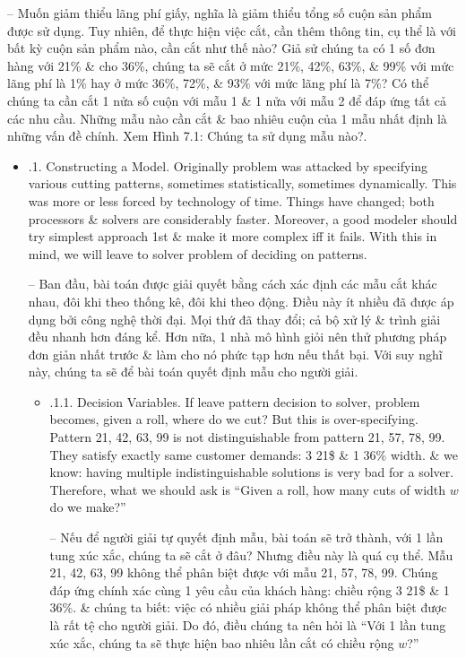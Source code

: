 \documentclass{article}
\begin{document}
\begin{itemize}
\begin{itemize}
        -- Muốn giảm thiểu lãng phí giấy, nghĩa là giảm thiểu tổng số cuộn sản phẩm được sử dụng. Tuy nhiên, để thực hiện việc cắt, cần thêm thông tin, cụ thể là với bất kỳ cuộn sản phẩm nào, cần cắt như thế nào? Giả sử chúng ta có 1 số đơn hàng với 21\% \& cho 36\%, chúng ta sẽ cắt ở mức 21\%, 42\%, 63\%, \& 99\% với mức lãng phí là 1\% hay ở mức 36\%, 72\%, \& 93\% với mức lãng phí là 7\%? Có thể chúng ta cần cắt 1 nửa số cuộn với mẫu 1 \& 1 nửa với mẫu 2 để đáp ứng tất cả các nhu cầu. Những mẫu nào cần cắt \& bao nhiêu cuộn của 1 mẫu nhất định là những vấn đề chính. Xem {\sf Hình 7.1: Chúng ta sử dụng mẫu nào?}.
        \begin{itemize}
            \item {.1. Constructing a Model.} Originally problem was attacked by specifying various cutting patterns, sometimes statistically, sometimes dynamically. This was more or less forced by technology of time. Things have changed; both processors \& solvers are considerably faster. Moreover, a good modeler should try simplest approach 1st \& make it more complex iff it fails. With this in mind, we will leave to solver problem of deciding on patterns.

            -- Ban đầu, bài toán được giải quyết bằng cách xác định các mẫu cắt khác nhau, đôi khi theo thống kê, đôi khi theo động. Điều này ít nhiều đã được áp dụng bởi công nghệ thời đại. Mọi thứ đã thay đổi; cả bộ xử lý \& trình giải đều nhanh hơn đáng kể. Hơn nữa, 1 nhà mô hình giỏi nên thử phương pháp đơn giản nhất trước \& làm cho nó phức tạp hơn nếu thất bại. Với suy nghĩ này, chúng ta sẽ để bài toán quyết định mẫu cho người giải.
            \begin{itemize}
                \item {.1.1. Decision Variables.} If leave pattern decision to solver, problem becomes, given a roll, where do we cut? But this is over-specifying. Pattern 21, 42, 63, 99 is not distinguishable from pattern 21, 57, 78, 99. They satisfy exactly same customer demands: 3 21\$ \& 1 36\% width. \& we know: having multiple indistinguishable solutions is very bad for a solver. Therefore, what we should ask is ``Given a roll, how many cuts of width $w$ do we make?''

                -- Nếu để người giải tự quyết định mẫu, bài toán sẽ trở thành, với 1 lần tung xúc xắc, chúng ta sẽ cắt ở đâu? Nhưng điều này là quá cụ thể. Mẫu 21, 42, 63, 99 không thể phân biệt được với mẫu 21, 57, 78, 99. Chúng đáp ứng chính xác cùng 1 yêu cầu của khách hàng: chiều rộng 3 21\$ \& 1 36\%. \& chúng ta biết: việc có nhiều giải pháp không thể phân biệt được là rất tệ cho người giải. Do đó, điều chúng ta nên hỏi là ``Với 1 lần tung xúc xắc, chúng ta sẽ thực hiện bao nhiêu lần cắt có chiều rộng $w$?''


\end{itemize}
\end{itemize}
\end{itemize}
\end{itemize}
\end{document}
